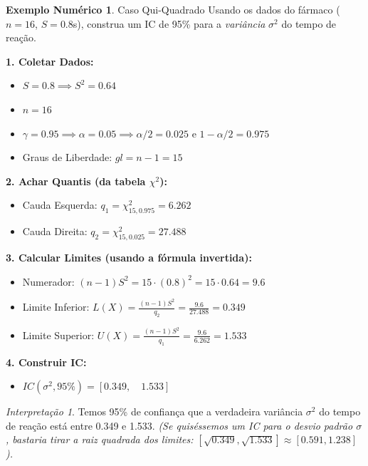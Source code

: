 \documentclass[12pt, a4paper]{article}
\theoremstyle{definition} %
\newtheorem{exemplo}{Exemplo Numérico}[section]
\theoremstyle{remark} %
\newtheorem{interpretacao}{Interpretação}[section]
\begin{document}
\begin{exemplo}{Caso Qui-Quadrado}
    Usando os dados do fármaco ($n=16$, $S=0.8$s), construa um IC de 95\% para a \textit{variância} $\sigma^2$ do tempo de reação.

    \textbf{1. Coletar Dados:}
    \begin{itemize}
        \item $S = 0.8 \implies S^2 = 0.64$
        \item $n = 16$
        \item $\gamma = 0.95 \implies \alpha = 0.05 \implies \alpha/2 = 0.025$ e $1-\alpha/2 = 0.975$
        \item Graus de Liberdade: $gl = n-1 = 15$
    \end{itemize}
    \textbf{2. Achar Quantis (da tabela $\chi^2$):}
    \begin{itemize}
        \item Cauda Esquerda: $q_1 = \chi^2_{15, 0.975} = 6.262$
        \item Cauda Direita: $q_2 = \chi^2_{15, 0.025} = 27.488$
    \end{itemize}
    \textbf{3. Calcular Limites (usando a fórmula invertida):}
    \begin{itemize}
        \item Numerador: $(n-1)S^2 = 15 \cdot (0.8)^2 = 15 \cdot 0.64 = 9.6$
        \item Limite Inferior: $L(X) = \frac{(n-1)S^2}{q_2} = \frac{9.6}{27.488} = 0.349$
        \item Limite Superior: $U(X) = \frac{(n-1)S^2}{q_1} = \frac{9.6}{6.262} = 1.533$
    \end{itemize}
    \textbf{4. Construir IC:}
    \begin{itemize}
        \item $IC(\sigma^2, 95\%) = [0.349, \quad 1.533]$
    \end{itemize}
    \begin{interpretacao}
        Temos 95\% de confiança que a verdadeira variância $\sigma^2$ do tempo de reação está entre 0.349 e 1.533.
        \textit{(Se quiséssemos um IC para o desvio padrão $\sigma$, bastaria tirar a raiz quadrada dos limites: $[\sqrt{0.349}, \sqrt{1.533}] \approx [0.591, 1.238]$).}
    \end{interpretacao}
\end{exemplo}

\newpage
\end{document}

